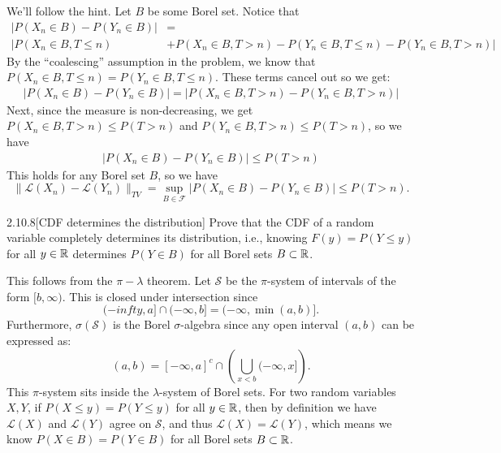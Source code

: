 \documentclass{pset}
\begin{document}
\begin{solution}
    We'll follow the hint. Let $B$ be some Borel set. Notice that
    \[
        \begin{aligned}
            |P(X_n\in B) - P(Y_n \in B)| &= \\|P(X_n\in B, T\leq n ) &+ P(X_n\in B, T > n) - P(Y_n\in B, T \leq n) - P(Y_n\in B, T>n)|
        \end{aligned}
    \]
    By the ``coalescing'' assumption in the problem, we know that $P(X_n\in B, T\leq n) = P(Y_n\in B, T\leq n)$. These terms cancel out so we get:
    \[
        \begin{aligned}
            |P(X_n\in B) - P(Y_n \in B)| = | P(X_n\in B, T > n) - P(Y_n\in B, T>n)|
        \end{aligned}
    \]
    Next, since the measure is non-decreasing, we get $P(X_n\in B, T> n) \leq P(T>n)$ and $P(Y_n\in B, T > n) \leq P(T>n)$, so we have
    \[
        \begin{aligned}
            |P(X_n\in B) - P(Y_n \in B)| \leq P(T>n)
        \end{aligned}
    \]
    This holds for any Borel set $B$, so we have
    \[
        \|\mathcal{L}(X_n) - \mathcal{L}(Y_n)\|_{TV} = \sup_{B\in \mathcal{F}}|P(X_n\in B)-P(Y_n\in B)| \leq P(T>n).
    \]
\end{solution}

\begin{problem}{2.10.8}[CDF determines the distribution]
    Prove that the CDF of a random variable completely determines its distribution, i.e., knowing $F(y)=P(Y\leq y)$ for all $y\in \mathbb{R}$ determines $P(Y\in B)$ for all Borel sets $B\subset \mathbb{R}$.
\end{problem}

\begin{solution}
    This follows from the $\pi-\lambda$ theorem. Let $\mathcal{S}$ be the $\pi$-system of intervals of the form $[b,\infty)$. This is closed under intersection since
    \[
        (-infty,a]\cap (-\infty,b] = (-\infty, \min(a,b)]
    .\] 
    Furthermore, $\sigma(\mathcal{S})$ is the Borel $\sigma$-algebra since any open interval $(a,b)$ can be expressed as:
    \[ 
            (a,b) = [-\infty, a]^c \cap \left(\bigcup_{x<b} (-\infty, x]\right)
    .\] 
    This $\pi$-system sits inside the $\lambda$-system of Borel sets. For two random variables $X,Y$, if $P(X\leq y)=P(Y\leq y)$ for all $y\in \mathbb{R}$, then by definition we have $\mathcal{L}(X)$ and $\mathcal{L}(Y)$ agree on $\mathcal{S}$, and thus $\mathcal{L}(X)=\mathcal{L}(Y)$, which means we know $P(X\in B)=P(Y\in B)$ for all Borel sets $B\subset \mathbb{R}$.
\end{solution}
\end{document}

